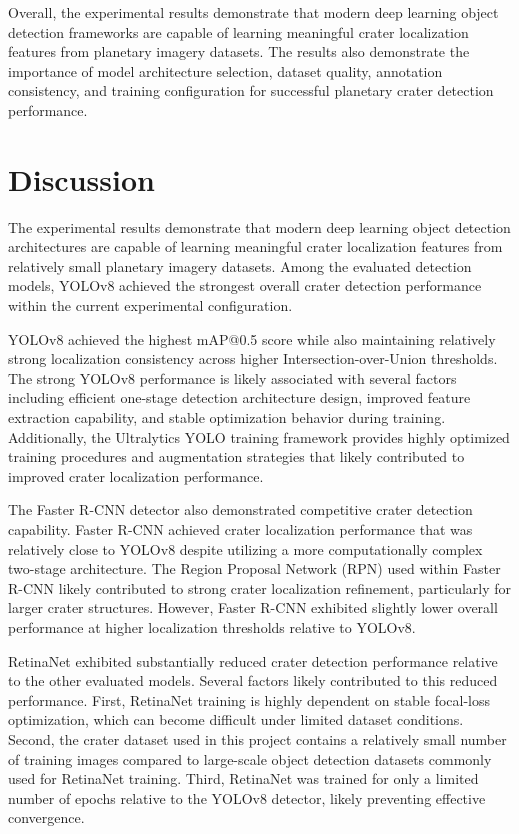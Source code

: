 \documentclass[conference]{IEEEtran}
\begin{document}
	Overall, the experimental results demonstrate that modern deep learning object detection frameworks are capable of learning meaningful crater localization features from planetary imagery datasets. The results also demonstrate the importance of model architecture selection, dataset quality, annotation consistency, and training configuration for successful planetary crater detection performance.
	
	\section{Discussion}
	
	The experimental results demonstrate that modern deep learning object detection architectures are capable of learning meaningful crater localization features from relatively small planetary imagery datasets. Among the evaluated detection models, YOLOv8 achieved the strongest overall crater detection performance within the current experimental configuration.
	
	YOLOv8 achieved the highest mAP@0.5 score while also maintaining relatively strong localization consistency across higher Intersection-over-Union thresholds. The strong YOLOv8 performance is likely associated with several factors including efficient one-stage detection architecture design, improved feature extraction capability, and stable optimization behavior during training. Additionally, the Ultralytics YOLO training framework provides highly optimized training procedures and augmentation strategies that likely contributed to improved crater localization performance.
	
	The Faster R-CNN detector also demonstrated competitive crater detection capability. Faster R-CNN achieved crater localization performance that was relatively close to YOLOv8 despite utilizing a more computationally complex two-stage architecture. The Region Proposal Network (RPN) used within Faster R-CNN likely contributed to strong crater localization refinement, particularly for larger crater structures. However, Faster R-CNN exhibited slightly lower overall performance at higher localization thresholds relative to YOLOv8.
	
	RetinaNet exhibited substantially reduced crater detection performance relative to the other evaluated models. Several factors likely contributed to this reduced performance. First, RetinaNet training is highly dependent on stable focal-loss optimization, which can become difficult under limited dataset conditions. Second, the crater dataset used in this project contains a relatively small number of training images compared to large-scale object detection datasets commonly used for RetinaNet training. Third, RetinaNet was trained for only a limited number of epochs relative to the YOLOv8 detector, likely preventing effective convergence.
	
\end{document}
